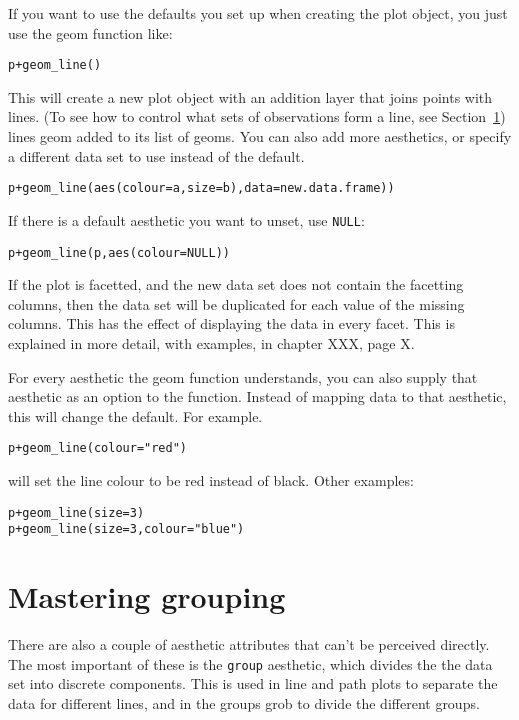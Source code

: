 If you want to use the defaults you set up when creating the plot object, you just use the geom function like:

\begin{alltt}
p + geom_line()
\end{alltt}

This will create a new plot object with an addition layer that joins points with lines.  (To see how to control what sets of observations form a line, see Section~\ref{sec:grouping}) lines geom added to its list of geoms.   You can also add more aesthetics, or specify a different data set to use instead of the default.  

\begin{alltt}
p + geom_line(aes(colour=a, size=b), data=new.data.frame))
\end{alltt}

If there is a default aesthetic you want to unset, use {\tt NULL}:

\begin{alltt}
p + geom_line(p, aes(colour=NULL))
\end{alltt}

If the plot is facetted, and the new data set does not contain the facetting columns, then the data set will be duplicated for each value of the missing columns.  This has the effect of displaying the data in every facet.  This is explained in more detail, with examples, in chapter XXX, page X.

For every aesthetic the geom function understands, you can also supply that aesthetic as an option to the function.  Instead of mapping data to that aesthetic, this will change the default.  For example.

\begin{alltt}
p + geom_line(colour="red")  
\end{alltt}

\noindent will set the line colour to be red instead of black.  Other examples:

\begin{alltt}
p + geom_line(size=3)  
p + geom_line(size=3, colour="blue")  
\end{alltt}

\section{Mastering grouping}
\label{sec:grouping}

There are also a couple of aesthetic attributes that can't be perceived directly.  The most important of these is the {\tt group} aesthetic, which divides the the data set into discrete components.   This is used in line and path plots to separate the data for different lines, and in the groups grob to divide the different groups. 

